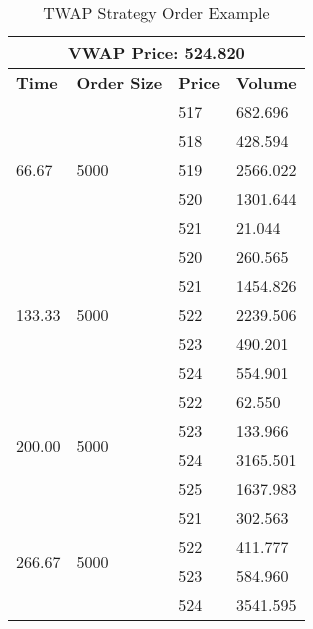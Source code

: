 \begin{table}[htbp]
\begin{center}
\caption{TWAP Strategy Order Example} \label{tab:twap_order}
\begin{tabular}{l|l|l|l}
\hline \hline
\multicolumn{4}{c}{\textbf{VWAP Price}: 524.820}                                      \\
\hline
\textbf{Time}                    & \textbf{Order Size}        & \textbf{Price} & \textbf{Volume}   \\
\hline
\multirow{5}{*}{66.67}  & \multirow{5}{*}{5000} & 517   & 682.696  \\
                        &                          & 518   & 428.594  \\
                        &                          & 519   & 2566.022 \\
                        &                          & 520   & 1301.644 \\
                        &                          & 521   & 21.044   \\
\hline                   
\multirow{5}{*}{133.33} & \multirow{5}{*}{5000} & 520   & 260.565  \\
                        &                          & 521   & 1454.826 \\
                        &                          & 522   & 2239.506 \\
                        &                          & 523   & 490.201  \\
                        &                          & 524   & 554.901  \\
\hline                            
\multirow{4}{*}{200.00} & \multirow{4}{*}{5000} & 522   & 62.550   \\
                        &                          & 523   & 133.966  \\
                        &                          & 524   & 3165.501 \\
                        &                          & 525   & 1637.983 \\
\hline                        
\multirow{5}{*}{266.67} & \multirow{5}{*}{5000} & 521   & 302.563  \\
                        &                          & 522   & 411.777  \\
                        &                          & 523   & 584.960  \\
                        &                          & 524   & 3541.595 \\

\end{tabular}
\end{center}
\end{table}
